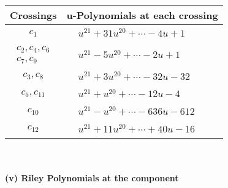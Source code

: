 \documentclass[1p]{elsarticle_modified}
\theoremstyle{definition}
\begin{document}
\begin{tabular}{m{50pt}|m{274pt}}
Crossings & \hspace{64pt}u-Polynomials at each crossing \\
\hline $$\begin{aligned}c_{1}\end{aligned}$$&$\begin{aligned}
&u^{21}+31 u^{20}+\cdots-4 u+1
\end{aligned}$\\
\hline $$\begin{aligned}c_{2},c_{4},c_{6}\\c_{7},c_{9}\end{aligned}$$&$\begin{aligned}
&u^{21}-5 u^{20}+\cdots-2 u+1
\end{aligned}$\\
\hline $$\begin{aligned}c_{3},c_{8}\end{aligned}$$&$\begin{aligned}
&u^{21}+3 u^{20}+\cdots-32 u-32
\end{aligned}$\\
\hline $$\begin{aligned}c_{5},c_{11}\end{aligned}$$&$\begin{aligned}
&u^{21}+u^{20}+\cdots-12 u-4
\end{aligned}$\\
\hline $$\begin{aligned}c_{10}\end{aligned}$$&$\begin{aligned}
&u^{21}- u^{20}+\cdots-636 u-612
\end{aligned}$\\
\hline $$\begin{aligned}c_{12}\end{aligned}$$&$\begin{aligned}
&u^{21}+11 u^{20}+\cdots+40 u-16
\end{aligned}$\\
\hline
\end{tabular}\\~\\
\newpage\renewcommand{\arraystretch}{1}
\flushleft \textbf{(v) Riley Polynomials at the component}\newline \\
\end{document}
